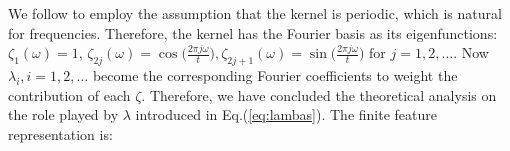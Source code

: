 \documentclass[sigconf,anonymous,review]{acmart}
\begin{document}
{%
We follow \citep{Xu2019-attention-time-bochner} to employ the assumption that the kernel is periodic, which is natural for frequencies.
Therefore, the kernel has the Fourier basis as its eigenfunctions: $\zeta_{1}(\omega)=1$, $\zeta_{2j}(\omega) = \cos \big(\frac{ 2\pi j \omega}{t}\big), \zeta_{2j+1}(\omega) = \sin \big(\frac{2\pi j \omega}{t} \big) \text{  for } j=1,2,\ldots$.
Now $\lambda_i, i=1,2,\ldots$ become the corresponding Fourier coefficients to weight the contribution of each $\zeta$.
Therefore, we have concluded the theoretical analysis on the role played by $\lambda$ introduced in Eq.(\ref{eq:lambas}).
The finite feature representation is:
}
\end{document}
